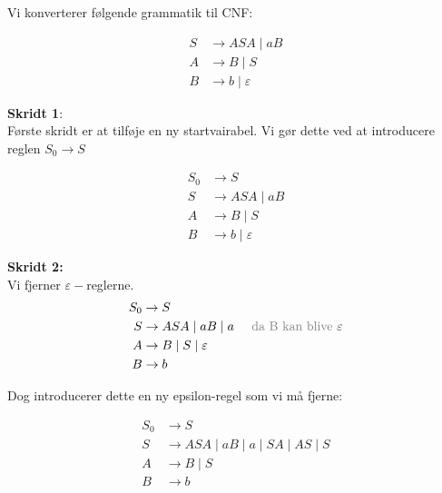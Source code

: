 \begin{example}
  Vi konverterer følgende grammatik til CNF:

\begin{equation*}
\begin{split}
  S &\rightarrow ASA\;|\;aB \\
  A &\rightarrow B\;|\;S \\
B &\rightarrow b\;|\; \varepsilon
\end{split}
\end{equation*}

\textbf{Skridt 1}:\\
\noindent
Første skridt er at tilføje en ny startvairabel. Vi gør dette ved at introducere reglen $S_{0} \rightarrow S$

\begin{equation*}
\begin{split}
  S_{0} &\rightarrow S\\
  S &\rightarrow ASA \;|\; aB\\
  A &\rightarrow B \;|\; S\\
  B &\rightarrow b \;|\; \varepsilon
\end{split}
\end{equation*}

\textbf{Skridt 2:}\\
\noindent
Vi fjerner $\varepsilon-$reglerne.
\begin{equation*}
\begin{split}
  S_{0} &\rightarrow S\\
  S &\rightarrow ASA \;|\; aB \;|\; a\;\;\;\;\; \text{\color{gray}da B kan blive }\varepsilon\\
  A &\rightarrow B \;|\; S \; | \; \varepsilon\\
  B &\rightarrow b
\end{split}
\end{equation*}

\noindent
Dog introducerer dette en ny epsilon-regel som vi må fjerne:


\begin{equation*}
\begin{split}
  S_{0} &\rightarrow S\\
  S &\rightarrow ASA \;|\; aB \;|\; a \;| \;SA \;| \;AS \;| \;S\\
  A &\rightarrow B \;|\; S \\
  B &\rightarrow b
\end{split}
\end{equation*}


\end{example}
